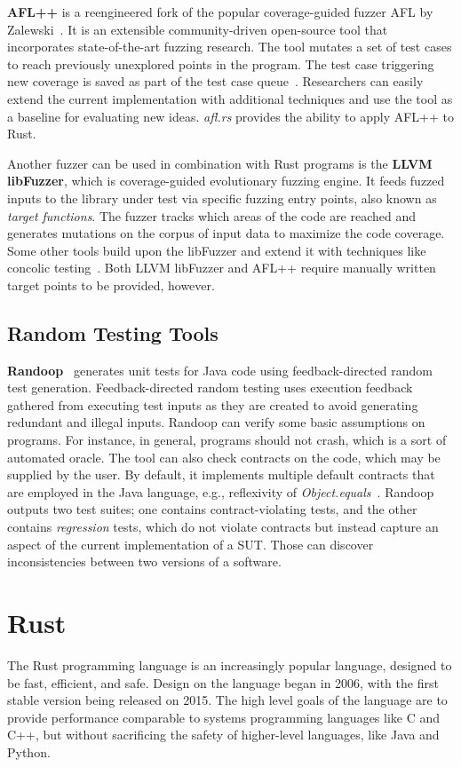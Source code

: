 \documentclass{article}
\begin{document}
\textbf{AFL++} is a reengineered fork of the popular coverage-guided fuzzer AFL by Zalewski~\cite{Zalewski2014}. It is an extensible community-driven open-source tool that incorporates state-of-the-art fuzzing research. The tool mutates a set of test cases to reach previously unexplored points in the program. The test case triggering new coverage is saved as part of the test case queue~\cite{Fioraldi2020}. Researchers can easily extend the current implementation with additional techniques and use the tool as a baseline for evaluating new ideas. \textit{afl.rs} provides the ability to apply AFL++ to Rust. 

Another fuzzer can be used in combination with Rust programs is the \textbf{LLVM libFuzzer}, which is coverage-guided evolutionary fuzzing engine. It feeds fuzzed inputs to the library under test via specific fuzzing entry points, also known as \textit{target functions}. The fuzzer tracks which areas of the code are reached and generates mutations on the corpus of input data to maximize the code coverage. Some other tools build upon the libFuzzer and extend it with techniques like concolic testing~\cite{Rocha2020,Le2019}. Both LLVM libFuzzer and AFL++ require manually written target points to be provided, however. 

\subsection{Random Testing Tools}
\textbf{Randoop}~\cite{Pacheco_2007} generates unit tests for Java code using feedback-directed random test generation. Feedback-directed random testing uses execution feedback gathered from executing test inputs as they are created to avoid generating redundant and illegal inputs. Randoop can verify some basic assumptions on programs. For instance, in general, programs should not crash, which is a sort of automated oracle. The tool can also check  contracts on the code, which may be supplied by the user. By default, it implements multiple default contracts that are employed in the Java language, e.g., reflexivity of \textit{Object.equals}~\cite{Fraser2013}. Randoop outputs two test suites; one contains contract-violating tests, and the other contains \textit{regression} tests, which do not violate contracts but instead capture an aspect of the current implementation of a \ac{SUT}. Those can discover inconsistencies between two versions of a software.

\section{Rust}
The Rust programming language is an increasingly popular language, designed to be fast, efficient, and safe. Design on the language began in 2006, with the first stable version being released on 2015. The high level goals of the language are to provide performance comparable to systems programming languages like C and C++, but without sacrificing the safety of higher-level languages, like Java and Python.
\end{document}

